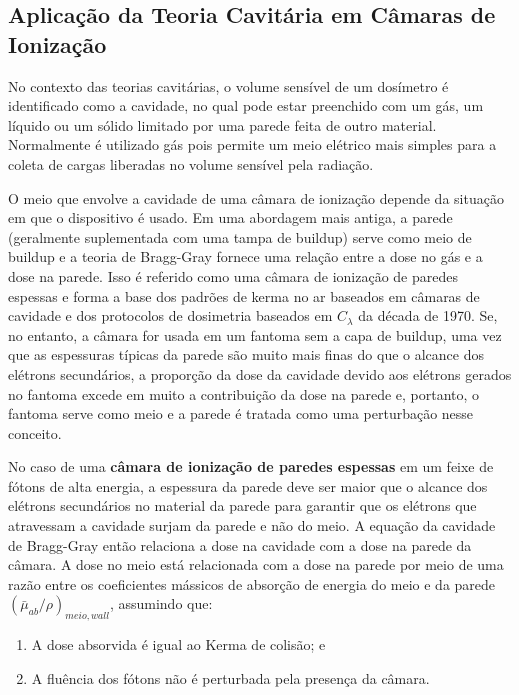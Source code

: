\documentclass[11pt,a4paper]{article}
\begin{document}
		\subsection{Aplicação da Teoria Cavitária em Câmaras de Ionização}

			No contexto das teorias cavitárias, o volume sensível de um dosímetro é identificado como a cavidade, no qual pode estar preenchido com um gás, um líquido ou um sólido limitado por uma parede feita de outro material. Normalmente é utilizado gás pois permite um meio elétrico mais simples para a coleta de cargas liberadas no volume sensível pela radiação. 

			O meio que envolve a cavidade de uma câmara de ionização depende da situação em que o dispositivo é usado. Em uma abordagem mais antiga, a parede (geralmente suplementada com uma tampa de buildup) serve como meio de buildup e a teoria de Bragg-Gray fornece uma relação entre a dose no gás e a dose na parede. Isso é referido como uma câmara de ionização de paredes espessas e forma a base dos padrões de kerma no ar baseados em câmaras de cavidade e dos protocolos de dosimetria baseados em $C_\lambda$ da década de 1970. Se, no entanto, a câmara for usada em um fantoma sem a capa de buildup, uma vez que as espessuras típicas da parede são muito mais finas do que o alcance dos elétrons secundários, a proporção da dose da cavidade devido aos elétrons gerados no fantoma excede em muito a contribuição da dose na parede e, portanto, o fantoma serve como meio e a parede é tratada como uma perturbação nesse conceito.

			No caso de uma \textbf{\textcolor{CarnationPink}{câmara de ionização de paredes espessas}} em um feixe de fótons de alta energia, a espessura da parede deve ser maior que o alcance dos elétrons secundários no material da parede para garantir que os elétrons que atravessam a cavidade surjam da parede e não do meio. A equação da cavidade de Bragg-Gray então relaciona a dose na cavidade com a dose na parede da câmara. A dose no meio está relacionada com a dose na parede por meio de uma razão entre os coeficientes mássicos de absorção de energia do meio e da parede $(\bar{\mu}_{ab}/\rho)_{meio, wall}$, assumindo que:

			\begin{enumerate}
				\item A dose absorvida é igual ao Kerma de colisão; e
				\item A fluência dos fótons não é perturbada pela presença da câmara.
			\end{enumerate}
\end{document}
